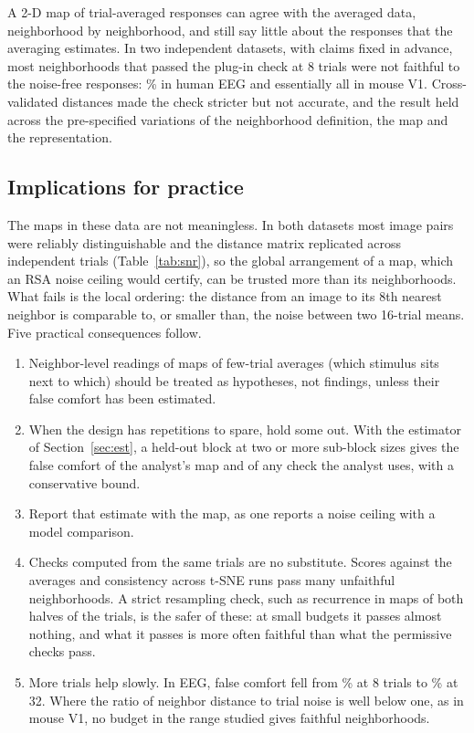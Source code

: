 
A 2-D map of trial-averaged responses can agree with the averaged data, neighborhood by
neighborhood, and still say little about the responses that the averaging estimates. In two
independent datasets, with claims fixed in advance, most neighborhoods that passed the plug-in
check at 8 trials were not faithful to the noise-free responses: \EegFCeight\% in human EEG and
essentially all in mouse V1. Cross-validated distances made the check stricter but not accurate,
and the result held across the pre-specified variations of the neighborhood definition, the map
and the representation.

\subsection{Implications for practice}

The maps in these data are not meaningless. In both datasets most image pairs were reliably
distinguishable and the distance matrix replicated across independent trials
(Table~\ref{tab:snr}), so the global arrangement of a map, which an RSA noise ceiling would
certify, can be trusted more than its neighborhoods. What fails is the local ordering: the distance
from an image to its 8th nearest neighbor is comparable to, or smaller than, the noise between
two 16-trial means. Five practical consequences follow.
\begin{enumerate}[leftmargin=*]
  \item Neighbor-level readings of maps of few-trial averages (which stimulus sits next to which)
  should be treated as hypotheses, not findings, unless their false comfort has been estimated.
  \item When the design has repetitions to spare, hold some out. With the estimator of
  Section~\ref{sec:est}, a held-out block at two or more sub-block sizes gives the false comfort of
  the analyst's map and of any check the analyst uses, with a conservative bound.
  \item Report that estimate with the map, as one reports a noise ceiling with a model comparison.
  \item Checks computed from the same trials are no substitute. Scores against the averages and
  consistency across t-SNE runs pass many unfaithful neighborhoods. A strict resampling check, such
  as recurrence in maps of both halves of the trials, is the safer of these: at small budgets it
  passes almost nothing, and what it passes is more often faithful than what the permissive checks
  pass.
  \item More trials help slowly. In EEG, false comfort fell from \EegFCeight\% at 8 trials to
  \EegFCthirtytwo\% at 32. Where the ratio of neighbor distance to trial noise is well below one,
  as in mouse V1, no budget in the range studied gives faithful neighborhoods.
\end{enumerate}

